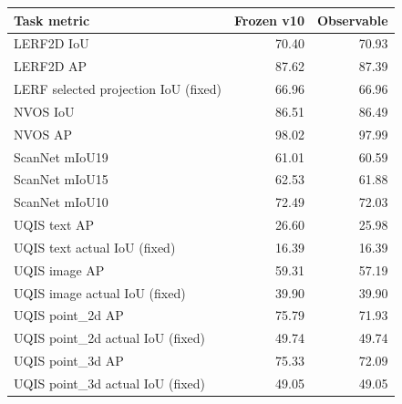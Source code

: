 \begin{tabular}{lrr}
\toprule
Task metric & Frozen v10 & Observable \\
\midrule
LERF2D IoU & 70.40 & 70.93 \\
LERF2D AP & 87.62 & 87.39 \\
LERF selected projection IoU (fixed) & 66.96 & 66.96 \\
NVOS IoU & 86.51 & 86.49 \\
NVOS AP & 98.02 & 97.99 \\
ScanNet mIoU19 & 61.01 & 60.59 \\
ScanNet mIoU15 & 62.53 & 61.88 \\
ScanNet mIoU10 & 72.49 & 72.03 \\
UQIS text AP & 26.60 & 25.98 \\
UQIS text actual IoU (fixed) & 16.39 & 16.39 \\
UQIS image AP & 59.31 & 57.19 \\
UQIS image actual IoU (fixed) & 39.90 & 39.90 \\
UQIS point\_2d AP & 75.79 & 71.93 \\
UQIS point\_2d actual IoU (fixed) & 49.74 & 49.74 \\
UQIS point\_3d AP & 75.33 & 72.09 \\
UQIS point\_3d actual IoU (fixed) & 49.05 & 49.05 \\
\bottomrule
\end{tabular}
